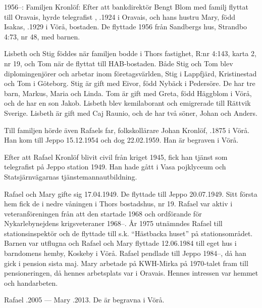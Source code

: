 1956--:
Familjen Kronlöf:	Efter att bankdirektör Bengt Blom med familj flyttat till	Oravais, hyrde telegrafist , .1924 i Oravais, och hans hustru Mary, född Isakas, .1929 i Vörå, bostaden. De flyttade 1956 från Sandbergs hus, Strandbo 4:73, nr 48, med barnen.
\begin{jhchildren}
  \item {}
  \item {}
  \item {}
\end{jhchildren}
Lisbeth och Stig föddes när familjen bodde i Thors fastighet, R:nr 4:143, karta 2, nr 19, och Tom när de flyttat till HAB-bostaden. Både Stig och Tom blev diplomingenjörer och	arbetar inom företagsvärlden, Stig i Lappfjärd, Kristinestad och Tom i Göteborg. Stig är gift med Eivor, född Nybäck i Pedersöre. De har tre barn, Markus, Maria och Linda. Tom är gift med Greta, född Häggblom i Vörå, och de har en son Jakob. Lisbeth blev kemilaborant och emigrerade till Rättvik	Sverige. Lisbeth är gift med Caj Raunio, och de har två söner, Johan och Anders.

Till familjen hörde även Rafaels far, folkskollärare Johan Kronlöf, .1875 i Vörå. Han kom till Jeppo 15.12.1954 och dog 22.02.1959. Han är begraven i Vörå.

Efter att Rafael Kronlöf blivit civil från kriget 1945, fick han	tjänst som telegrafist på Jeppo station 1949. Han hade gått i	Vasa pojklyceum och Statsjärnvägarnas tjänstemannautbildning.

Rafael och Mary gifte sig 17.04.1949. De flyttade till Jeppo 20.07.1949. Sitt första hem fick de i nedre våningen i Thors bostadshus, nr 19.  Rafael var aktiv i veteranföreningen från att den startade 1968 och ordförande för Nykarlebynejdens krigsveteraner 1968--. År 1975 utnämndes Rafael till stationsinspektör och de flyttade till s.k. ``Hästbacka huset'' på stationsområdet. Barnen var utflugna och Rafael och Mary flyttade 12.06.1984	till eget hus i barndomens hemby, Koskeby i Vörå.	Rafael pendlade till Jeppo 1984--, då han gick i pension sista maj. Mary arbetade på KWH-Mirka på 1970-talet fram till pensioneringen, då hennes arbetsplats var i Oravais.  Hennes intressen var hemmet och handarbeten.

Rafael .2005  ---  Mary .2013. De är begravna i Vörå.



